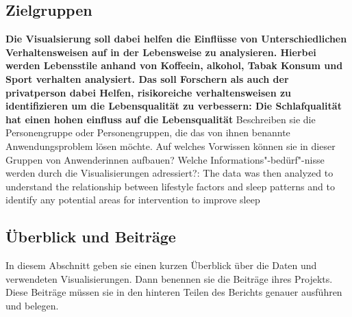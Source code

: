 \documentclass[usegeometry=true]{scrartcl}
\begin{document}
\subsection{Zielgruppen}
\textbf {Die Visualsierung soll dabei helfen die Einflüsse von Unterschiedlichen Verhaltensweisen auf in der Lebensweise zu analysieren. Hierbei werden Lebensstile anhand von Koffeein, alkohol, Tabak Konsum und Sport verhalten analysiert. Das  soll Forschern als auch der privatperson dabei Helfen, risikoreiche verhaltensweisen zu identifizieren um die Lebensqualität zu verbessern: Die Schlafqualität hat einen hohen einfluss auf die Lebensqualität }
Beschreiben sie die Personengruppe oder Personengruppen, die das von ihnen benannte Anwendungsproblem lösen möchte. Auf welches Vorwissen können sie in dieser Gruppen von Anwenderinnen aufbauen? Welche Informations"-bedürf"-nisse werden durch die Visualisierungen adressiert?: The data was then analyzed to understand the relationship between lifestyle factors and sleep patterns and to identify any potential areas for intervention to improve sleep
\subsection{Überblick und Beiträge}
In diesem Abschnitt geben sie einen kurzen Überblick über die Daten und verwendeten Visualisierungen. Dann benennen sie die Beiträge ihres Projekts. Diese Beiträge müssen sie in den hinteren Teilen des Berichts genauer ausführen und belegen.
\end{document}
